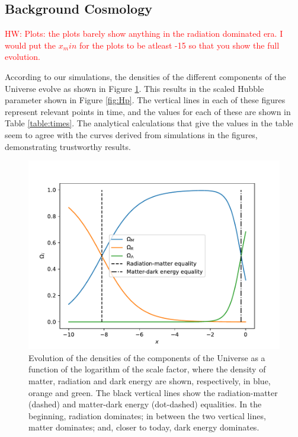 \documentclass{aa}
\newcommand{\hw}[1]{\textcolor{red}{HW: #1}}
\begin{document}
\subsection{Background Cosmology}

\hw{Plots: the plots barely show anything in the radiation dominated era. I would put the $x_min$ for the plots to be atleast -15 so that you show the full evolution.}

According to our simulations, the densities of the different components of the Universe evolve as shown in Figure \ref{fig:Omegas}. This results in the scaled Hubble parameter shown in Figure \ref{fig:Hp}. The vertical lines in each of these figures represent relevant points in time, and the values for each of these are shown in Table \ref{table:times}. The analytical calculations that give the values in the table seem to agree with the curves derived from simulations in the figures, demonstrating trustworthy results.

\begin{figure}[ht]
\centering
\includegraphics[width=\hsize]{figures/Omegas.pdf}
  \caption{Evolution of the densities of the components of the Universe as a function of the logarithm of the scale factor, where the density of matter, radiation and dark energy are shown, respectively, in blue, orange and green. The black vertical lines show the radiation-matter (dashed) and matter-dark energy (dot-dashed) equalities. In the beginning, radiation dominates; in between the two vertical lines, matter dominates; and, closer to today, dark energy dominates.}
     \label{fig:Omegas}
\end{figure}
\end{document}
